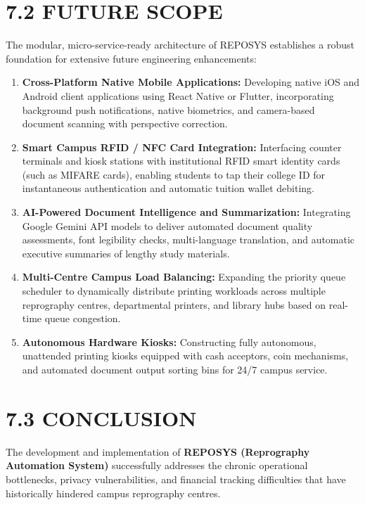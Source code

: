 \documentclass[12pt,a4paper,oneside]{report}
\begin{document}
\section{7.2 FUTURE SCOPE}
The modular, micro-service-ready architecture of REPOSYS establishes a robust foundation for extensive future engineering enhancements:
\begin{enumerate}[leftmargin=0.35in, itemsep=2pt]
  \item \textbf{Cross-Platform Native Mobile Applications:} Developing native iOS and Android client applications using React Native or Flutter, incorporating background push notifications, native biometrics, and camera-based document scanning with perspective correction.
  \item \textbf{Smart Campus RFID / NFC Card Integration:} Interfacing counter terminals and kiosk stations with institutional RFID smart identity cards (such as MIFARE cards), enabling students to tap their college ID for instantaneous authentication and automatic tuition wallet debiting.
  \item \textbf{AI-Powered Document Intelligence and Summarization:} Integrating Google Gemini API models to deliver automated document quality assessments, font legibility checks, multi-language translation, and automatic executive summaries of lengthy study materials.
  \item \textbf{Multi-Centre Campus Load Balancing:} Expanding the priority queue scheduler to dynamically distribute printing workloads across multiple reprography centres, departmental printers, and library hubs based on real-time queue congestion.
  \item \textbf{Autonomous Hardware Kiosks:} Constructing fully autonomous, unattended printing kiosks equipped with cash acceptors, coin mechanisms, and automated document output sorting bins for 24/7 campus service.
\end{enumerate}

\section{7.3 CONCLUSION}
The development and implementation of \textbf{REPOSYS (Reprography Automation System)} successfully addresses the chronic operational bottlenecks, privacy vulnerabilities, and financial tracking difficulties that have historically hindered campus reprography centres. 
\end{document}
